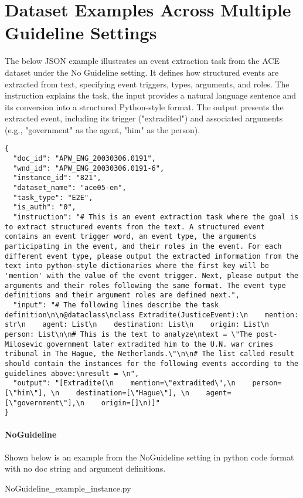 \section{Dataset Examples Across Multiple Guideline Settings}
\label{sec:app_dd}
The below JSON example illustrates an event extraction task from the ACE dataset under the No Guideline setting. It defines how structured events are extracted from text, specifying event triggers, types, arguments, and roles. The instruction explains the task, the input provides a natural language sentence and its conversion into a structured Python-style format. The output presents the extracted event, including its trigger ("extradited") and associated arguments (e.g., "government" as the agent, "him" as the person).

\begin{lstlisting}[style=customjson, caption={Prompt example for generating consolidated guidelines: Guideline-PN-Int, and Guideline-PS-Int.}, label={lst:guidelines3}, aboveskip=10pt, belowskip=10pt]
{
  "doc_id": "APW_ENG_20030306.0191",
  "wnd_id": "APW_ENG_20030306.0191-6",
  "instance_id": "821",
  "dataset_name": "ace05-en",
  "task_type": "E2E",
  "is_auth": "0",
  "instruction": "# This is an event extraction task where the goal is to extract structured events from the text. A structured event contains an event trigger word, an event type, the arguments participating in the event, and their roles in the event. For each different event type, please output the extracted information from the text into python-style dictionaries where the first key will be 'mention' with the value of the event trigger. Next, please output the arguments and their roles following the same format. The event type definitions and their argument roles are defined next.",
  "input": "# The following lines describe the task definition\n\n@dataclass\nclass Extradite(JusticeEvent):\n    mention: str\n    agent: List\n    destination: List\n    origin: List\n    person: List\n\n# This is the text to analyze\ntext = \"The post-Milosevic government later extradited him to the U.N. war crimes tribunal in The Hague, the Netherlands.\"\n\n# The list called result should contain the instances for the following events according to the guidelines above:\nresult = \n",
  "output": "[Extradite(\n    mention=\"extradited\",\n    person=[\"him\"], \n    destination=[\"Hague\"], \n    agent=[\"government\"],\n    origin=[]\n)]"
}
\end{lstlisting}

\paragraph{NoGuideline}
Shown below is an example from the NoGuideline setting in python code format with no doc string and argument definitions.
\vspace{10pt} %

{NoGuideline_example_instance.py}

